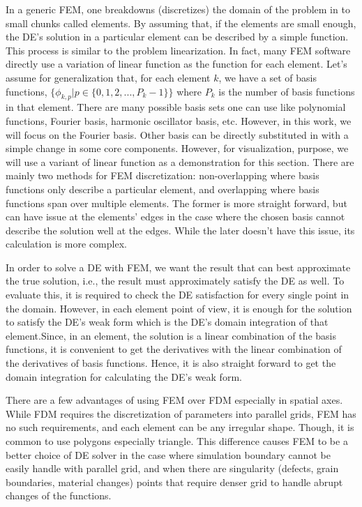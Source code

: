 \documentclass[preprint, 12pt]{revtex4-2}
\numberwithin{equation}{section}
\begin{document}
In a generic FEM, one breakdowns (discretizes) the domain of the problem in to small chunks called elements. By assuming that, if the elements are small enough, the DE's solution in a particular element can be described by a simple function. This process is similar to the problem linearization. In fact, many FEM software directly use a variation of linear function as the function for each element. Let's assume for generalization that, for each element $k$, we have a set of basis functions, $\{\phi_{k,p}|p\in \{0, 1, 2, ..., P_k-1\}\}$ where $P_k$ is the number of basis functions in that element. There are many possible basis sets one can use like polynomial functions, Fourier basis, harmonic oscillator basis, etc. However, in this work, we will focus on the Fourier basis. Other basis can be directly substituted in with a simple change in some core components. However, for visualization, purpose, we will use a variant of linear function as a demonstration for this section. There are mainly two methods for FEM discretization: non-overlapping where basis functions only describe a particular element, and overlapping where basis functions span over multiple elements. The former is more straight forward, but can have issue at the elements' edges in the case where the chosen basis cannot describe the solution well at the edges. While the later doesn't have this issue, its calculation is more complex.

In order to solve a DE with FEM, we want the result that can best approximate the true solution, i.e., the result must approximately satisfy the DE as well. To evaluate this, it is required to check the DE satisfaction for every single point in the domain. However, in each element point of view, it is enough for the solution to satisfy the DE's weak form which is the DE's domain integration of that element.Since, in an element, the solution is a linear combination of the basis functions, it is convenient to get the derivatives with the linear combination of the derivatives of basis functions. Hence, it is also straight forward to get the domain integration for calculating the DE's weak form.

There are a few advantages of using FEM over FDM especially in spatial axes. While FDM requires the discretization of parameters into parallel grids, FEM has no such requirements, and each element can be any irregular shape. Though, it is common to use polygons especially triangle. This difference causes FEM to be a better choice of DE solver in the case where simulation boundary cannot be easily handle with parallel grid, and when there are singularity (defects, grain boundaries, material changes) points that require denser grid to handle abrupt changes of the functions.
\end{document}
